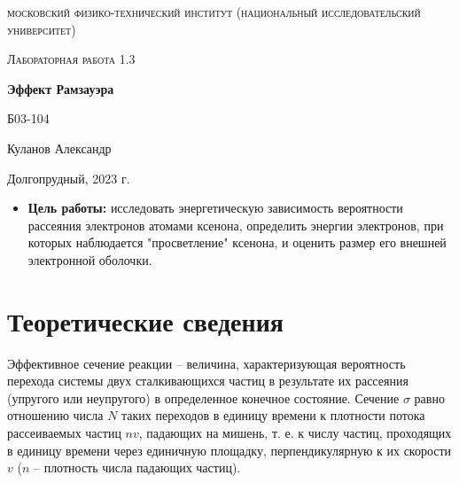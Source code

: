 \documentclass[a4paper, 12pt]{article}
\begin{document}
\begin{titlepage}
	\centering
	\vspace{5cm}
	{\scshape\LARGE московский физико-технический институт (национальный исследовательский университет) \par}
	\vspace{6cm}
	{\scshape\Large Лабораторная работа 1.3 \par}
	{\huge\bfseries Эффект Рамзауэра \par}
	\vspace{1cm}
	\vfill
\begin{flushright}
	{\large Б03-104}\par
	\vspace{0.3cm}
	{\LARGE Куланов Александр}
\end{flushright}
	

	\vfill


	Долгопрудный, 2023 г.
\end{titlepage}

\begin{itemize}
	\item \textbf{Цель работы:} исследовать энергетическую зависимость вероятности рассеяния электронов атомами ксенона, определить энергии электронов, при которых наблюдается "просветление" ксенона, и оценить размер его внешней электронной оболочки.
\end{itemize}

\section{Теоретические сведения}

Эффективное сечение реакции -- величина, характеризующая вероятность перехода системы двух сталкивающихся 
частиц в результате их рассеяния (упругого или неупругого) в определенное конечное состояние. 
Сечение $ \sigma $ равно отношению числа $ N $ таких переходов в единицу времени к плотности потока рассеиваемых 
частиц $ n v $, падающих на мишень, т. е. к числу частиц, проходящих в единицу времени через единичную площадку, 
перпендикулярную к их скорости $ v $ ($ n $ -- плотность числа падающих частиц).
\end{document}
